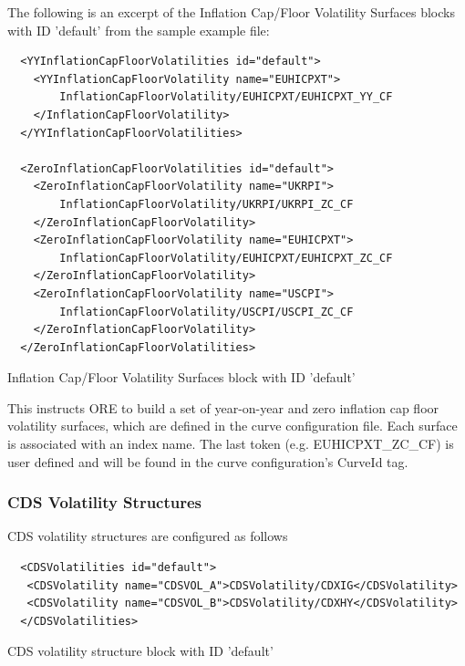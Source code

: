 \documentclass[12pt, a4paper]{article}
\begin{document}
The following is an excerpt of the Inflation Cap/Floor Volatility Surfaces blocks with ID 'default' from the sample example
file:

{
\begin{listing}[H]
\begin{verbatim}
  <YYInflationCapFloorVolatilities id="default">
    <YYInflationCapFloorVolatility name="EUHICPXT">
        InflationCapFloorVolatility/EUHICPXT/EUHICPXT_YY_CF
    </InflationCapFloorVolatility>
  </YYInflationCapFloorVolatilities>

  <ZeroInflationCapFloorVolatilities id="default">
    <ZeroInflationCapFloorVolatility name="UKRPI">
        InflationCapFloorVolatility/UKRPI/UKRPI_ZC_CF
    </ZeroInflationCapFloorVolatility>
    <ZeroInflationCapFloorVolatility name="EUHICPXT">
        InflationCapFloorVolatility/EUHICPXT/EUHICPXT_ZC_CF
    </ZeroInflationCapFloorVolatility>
    <ZeroInflationCapFloorVolatility name="USCPI">
        InflationCapFloorVolatility/USCPI/USCPI_ZC_CF
    </ZeroInflationCapFloorVolatility>
  </ZeroInflationCapFloorVolatilities>
\end{verbatim}
\caption{Inflation Cap/Floor Volatility Surfaces block with ID 'default'}
\label{lst:inflation_cap_floor_surface_spec}
\end{listing}

This instructs ORE to build a set of year-on-year and zero inflation cap floor volatility surfaces, which are defined in the curve
configuration file. Each surface is associated with an index name. The last token (e.g. EUHICPXT\_ZC\_CF) is user defined
and will be found in the curve configuration's CurveId tag.

\subsubsection{CDS Volatility Structures}

CDS volatility structures are configured as follows
\begin{listing}[H]
\begin{verbatim}
  <CDSVolatilities id="default">
   <CDSVolatility name="CDSVOL_A">CDSVolatility/CDXIG</CDSVolatility>
   <CDSVolatility name="CDSVOL_B">CDSVolatility/CDXHY</CDSVolatility>
  </CDSVolatilities>
\end{verbatim}
\caption{CDS volatility structure block with ID 'default'}
\label{lst:cdsvol_spec}
\end{listing}

}
\end{document}
